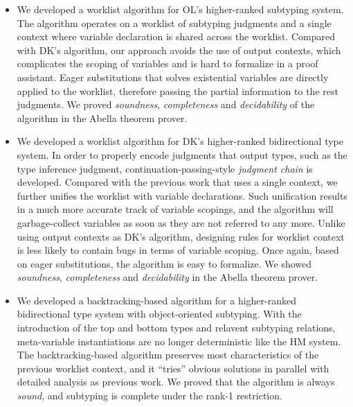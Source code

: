\begin{itemize}
    \item We developed a worklist algorithm for OL's higher-ranked subtyping system.
        The algorithm operates on a worklist of subtyping judgments and
        a single context where variable declaration is shared across the worklist.
        Compared with DK's algorithm, our approach avoids the use of output contexts,
        which complicates the scoping of variables and is hard to formalize
        in a proof assistant.
        Eager substitutions that solves existential variables are directly applied to
        the worklist, therefore passing the partial information to the rest judgments.
        We proved \emph{soundness}, \emph{completeness} and \emph{decidability} of
        the algorithm in the Abella theorem prover.

    \item We developed a worklist algorithm for DK's higher-ranked bidirectional type system.
        In order to properly encode judgments that
        output types, such as the type inference judgment,
        continuation-passing-style \emph{judgment chain} is developed.
        Compared with the previous work that uses a single context,
        we further unifies the worklist with variable declarations.
        Such unification results in a much more accurate track of variable scopings,
        and the algorithm will garbage-collect variables
        as soon as they are not referred to any more.
        Unlike using output contexts as DK's algorithm,
        designing rules for worklist context is less likely to contain bugs
        in terms of variable scoping.
        Once again, based on eager substitutions, the algorithm is easy to formalize.
        We showed \emph{soundness}, \emph{completeness} and \emph{decidability}
        in the Abella theorem prover.

    \item We developed a backtracking-based algorithm for a higher-ranked
        bidirectional type system with object-oriented subtyping.
        With the introduction of the top and bottom types and relavent subtyping relations,
        meta-variable instantiations are no longer deterministic like the HM system.
        The backtracking-based algorithm preserves most characteristics of the previous
        worklist context, and it ``tries'' obvious solutions in parallel with detailed analysis
        as previous work.
        We proved that the algorithm is always \emph{sound},
        and subtyping is complete under the rank-1 restriction.
\end{itemize}


